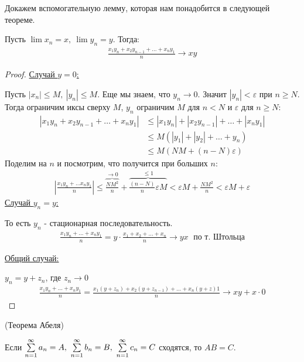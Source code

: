Докажем вспомогательную лемму, которая нам понадобится в следующей теореме.
\begin{lemma}
    Пусть $\lim x_n = x,\ \lim y_n = y$. Тогда:
    \begin{gather*}
        \frac{x_1 y_n + x_2y_{n-1} + \ldots + x_ny_1}{n} \to xy
    \end{gather*}
\end{lemma}
\begin{proof} \quad 

    \underline{Случай $y = 0$:}

    Пусть $|x_n| \leq M,\ |y_n| \leq M$. Еще мы знаем, что $y_n \to 0$. Значит $|y_n| < \varepsilon$ при $n \geq N$.
    Тогда ограничим иксы сверху $M$, $y_n$ ограничим $M$ для $n < N$ и $\varepsilon$ для $n \geqslant N$:
    \begin{align*}
        |x_1y_n + x_2y_{n-1} + \ldots + x_ny_1| &\leqslant |x_1y_n| + |x_2y_{n-1}| + \ldots + |x_ny_1| \\
        &\leqslant M(|y_1|+|y_2|+\ldots + y_n) \\
        &\leqslant M(NM + (n-N)\varepsilon)
    \end{align*}
    Поделим на $n$ и посмотрим, что получится при больших $n$:
    \begin{gather*}
        \left|\frac{x_1y_n+\ldots x_ny_1}{n}\right|
        \leqslant \overbrace{\frac{NM^2}{n}}^{\to 0} +  \overbrace{\frac{(n-N)}{n}\varepsilon M}^{\leq 1} 
        < \varepsilon M + \frac{NM^2}{n}
        < \varepsilon M + \varepsilon
    \end{gather*}
    \underline{Случай $y_n = y$:} 
    
    То есть $y_n$ - стационарная последовательность.
    \begin{gather*}
        \frac{x_1y_n + \ldots + x_ny_1}{n} = y \cdot \frac{x_1+x_2+\ldots+x_n}{n} \longrightarrow yx \; \text{ по т. Штольца}
    \end{gather*}

    \underline{Общий случай:} 
    
    $y_n = y+z_n$, где $z_n \longrightarrow 0$
    \begin{gather*}
        \frac{x_1y_n + \ldots + x_ny_1}{n} = \frac{x_1(y+z_n) + x_2(y+z_{n-1}) + \ldots + x_n(y+z)1}{n} \longrightarrow xy + x\cdot 0 
    \end{gather*}
\end{proof}
\begin{theorem}
    (Теорема Абеля) 
    
    Если $\sum \limits_{n=1}^\infty a_n = A,\ \sum \limits_{n=1}^\infty b_n = B,\ \sum \limits_{n=1}^\infty c_n = C$ сходятся, то $AB = C$.
\end{theorem}
